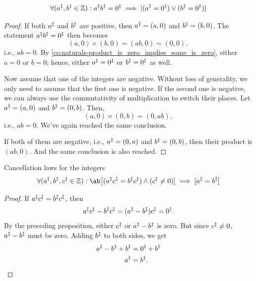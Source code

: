 \begin{prop}{}{}
  \begin{equation}
    \forall (a^{\ddagger}, b^{\ddagger} \in \mathbb{Z}) : a^{\ddagger}b^{\ddagger}
    = 0^{\ddagger}
    \implies [(a^{\ddagger} = 0^{\ddagger}) \lor (b^{\ddagger} = 0^{\ddagger})]
  \end{equation}
\end{prop}

\begin{proof}
  If both \(a^{\ddagger}\) and \(b^{\ddagger}\) are positive, then \(a^{\ddagger} = (a, 0)\) and
  \(b^{\ddagger} = (b, 0)\). The statement \(a^{\ddagger}b^{\ddagger} = 0^{\ddagger}\) then becomes
  \begin{equation}
    (a, 0) \times (b, 0) = (ab, 0) \sim (0, 0),
  \end{equation}
  i.e., \(ab = 0\). By \cref{co:naturals-product_is_zero_implies_some_is_zero}, either \(a = 0\) or
  \(b = 0\); hence, either \(a^{\ddagger} = 0^{\ddagger}\) or \(b^{\ddagger} = 0^{\ddagger}\) as well.

  Now assume that one of the integers are negative. Without loss of generality, we only need to
  assume that the first one is negative. If the second one is negative, we can always use the
  commutativity of multiplication to switch their places. Let \(a^{\ddagger} = (a, 0)\) and
  \(b^{\ddagger} = (0, b)\). Then,
  \begin{equation}
    (a, 0) \times (0, b) = (0, ab),
  \end{equation}
  i.e., \(ab = 0\). We've again reached the same conclusion.

  If both of them are negative, i.e., \(a^{\ddagger} = (0, a)\) and \(b^{\ddagger} = (0, b)\), then their
  product is \((ab, 0)\). And the same conclusion is also reached.
\end{proof}

\begin{cor}{Cancellation laws for the integers}{}
  \begin{equation}
    \forall (\Zint{a}, \Zint{b}, \Zint{c} \in \mathbb{Z}) : \ab\big[(\Zint{a}\Zint{c} = \Zint{b}\Zint{c}) \land (\Zint{c} \neq 0)] \implies [\Zint{a} = \Zint{b}]
  \end{equation}
\end{cor}

\begin{proof}
  If \(a^{\ddagger}c^{\ddagger} = b^{\ddagger}c^{\ddagger}\), then
  \begin{equation}
    a^{\ddagger}c^{\ddagger} - b^{\ddagger}c^{\ddagger} = (a^{\ddagger} - b^{\ddagger})c^{\ddagger} = 0^{\ddagger}.
  \end{equation}
  By the preceding proposition, either \(c^{\ddagger}\) or \(a^{\ddagger} - b^{\ddagger}\) is zero. But since
  \(c^{\ddagger} \neq 0\), \(a^{\ddagger} - b^{\ddagger}\) must be zero. Adding \(b^{\ddagger}\) to both sides, we
  get
  \begin{align}
    a^{\ddagger} - b^{\ddagger} + b^{\ddagger} & = 0^{\ddagger} + b^{\ddagger} \\
    a^{\ddagger}                       & = b^{\ddagger}. \qedhere
  \end{align}
\end{proof}

